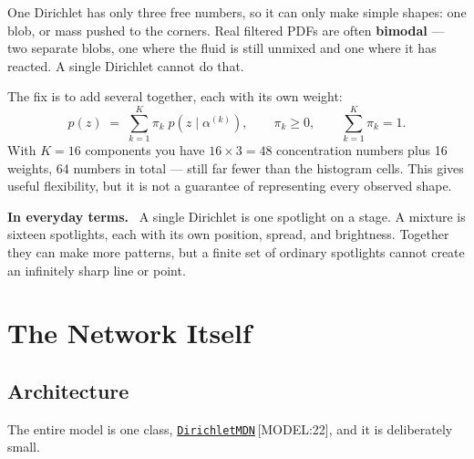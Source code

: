 \documentclass[11pt,a4paper]{report}
\newcommand{\srcbase}{vscode://file/Users/syellapa/Documents/Research/2026/ANSYS/Multi-ScalarPDF}
\newcommand{\dmdn}{dirichlet\string_mdn}
\newcommand{\srctag}[1]{{\footnotesize\textcolor{TagGray}{[#1]}}}
\newcommand{\Model}[2]{\href{\srcbase/\dmdn/model.py:#1}{\texttt{#2}}\,\srctag{MODEL:#1}}
\newcommand{\term}[1]{\textbf{#1}}
\renewcommand{\_}{\origtextunderscore\allowbreak}
\newlength{\calloutwidth}
\newcommand{\calloutOpen}{%
  \par\medskip\noindent
  \setlength{\calloutwidth}{\dimexpr\linewidth-2\fboxsep\relax}%
  \begin{lrbox}{\calloutbox}\begin{minipage}{\calloutwidth}}
\newcommand{\calloutClose}[1]{%
  \end{minipage}\end{lrbox}\colorbox{#1}{\usebox{\calloutbox}}\par\medskip}
\newenvironment{analogy}
  {\calloutOpen\textbf{In everyday terms.}\ }
  {\calloutClose{BoxBG}}
\begin{document}
One Dirichlet has only three free numbers, so it can only make simple shapes: one blob, or
mass pushed to the corners. Real filtered PDFs are often \term{bimodal} --- two separate
blobs, one where the fluid is still unmixed and one where it has reacted. A single Dirichlet
cannot do that.

The fix is to add several together, each with its own weight:
\[
  p(z) \;=\; \sum_{k=1}^{K} \pi_k \; p(z \mid \alpha^{(k)}),
  \qquad \pi_k \ge 0, \qquad \sum_{k=1}^{K} \pi_k = 1 .
\]
With $K = 16$ components you have $16 \times 3 = 48$ concentration numbers plus 16 weights,
64 numbers in total --- still far fewer than the histogram cells. This gives useful
flexibility, but it is not a guarantee of representing every observed shape.

\begin{analogy}
A single Dirichlet is one spotlight on a stage. A mixture is sixteen spotlights, each with
its own position, spread, and brightness. Together they can make more patterns, but a finite
set of ordinary spotlights cannot create an infinitely sharp line or point.
\end{analogy}

\chapter{The Network Itself}

\section{Architecture}

The entire model is one class, \Model{22}{DirichletMDN}, and it is deliberately small.

\begin{center}
\end{center}
\end{document}
